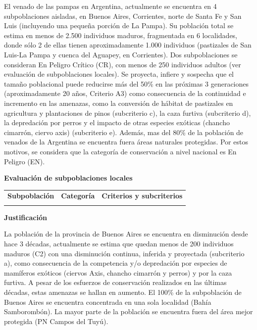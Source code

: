 \documentclass[
  x11names]{article}
\begin{document}
El venado de las pampas en Argentina, actualmente se encuentra en 4
subpoblaciones aisladas, en Buenos Aires, Corrientes, norte de Santa Fe
y San Luis (incluyendo una pequeña porción de La Pampa). Su población
total se estima en menos de 2.500 individuos maduros, fragmentada en 6
localidades, donde sólo 2 de ellas tienen aproximadamente 1.000
individuos (pastizales de San Luis-La Pampa y cuenca del Aguapey, en
Corrientes). Dos subpoblaciones se consideran En Peligro Crítico (CR),
con menos de 250 individuos adultos (ver evaluación de subpoblaciones
locales). Se proyecta, infiere y sospecha que el tamaño poblacional
puede reducirse más del 50\% en las próximas 3 generaciones
(aproximadamente 20 años, Criterio A3) como consecuencia de la
continuidad e incremento en las amenazas, como la conversión de hábitat
de pastizales en agricultura y plantaciones de pinos (subcriterio c), la
caza furtiva (subcriterio d), la depredación por perros y el impacto de
otras especies exóticas (chancho cimarrón, ciervo axis) (subcriterio e).
Además, mas del 80\% de la población de venados de la Argentina se
encuentra fuera áreas naturales protegidas. Por estos motivos, se
considera que la categoría de conservación a nivel nacional es En
Peligro (EN).

\textbf{Evaluación de subpoblaciones locales}

\begin{tabu} to 
\toprule
\textbf{Subpoblación} & \textbf{Categoría} & \textbf{Criterios y subcriterios}\\
\midrule
{} &  & \\
\bottomrule
\end{tabu}

\textbf{Justificación}

La población de la provincia de Buenos Aires se encuentra en disminución
desde hace 3 décadas, actualmente se estima que quedan menos de 200
individuos maduros (C2) con una disminución continua, inferida y
proyectada (subcriterio a), como consecuencia de la competencia y/o
depredación por especies de mamíferos exóticos (ciervos Axis, chancho
cimarrón y perros) y por la caza furtiva. A pesar de los esfuerzos de
conservación realizados en las últimas décadas, estas amenazas se hallan
en aumento. El 100\% de la subpoblación de Buenos Aires se encuentra
concentrada en una sola localidad (Bahía Samborombón). La mayor parte de
la población se encuentra fuera del área mejor protegida (PN Campos del
Tuyú).\vspace{0.5cm}
\end{document}
